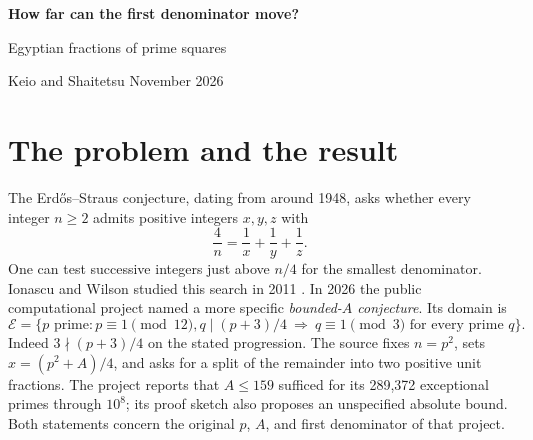 \documentclass[a4paper,11pt]{article}
\theoremstyle{definition}\newtheorem{question}[theorem]{Question}
\newcommand{\E}{\mathcal E}
\begin{document}
\begin{center}
{\LARGE\bfseries\color{ink}How far can the first denominator move?\par}
\vspace{4pt}
{\large Egyptian fractions of prime squares}\par\vspace{8pt}
Keio and Shaitetsu\quad\textperiodcentered{} November 2026
\end{center}

\begin{abstract}
A public bounded-shift conjecture asks for an absolute constant $C$ such that, for every prime $p$ in a specified exceptional class, $4/p^2$ has a three-term Egyptian fraction expansion containing $1/x$ with $4x-p^2\le C$. We disprove it. For each prime $\ell\ge7$ congruent to $3$ modulo $4$, a positive lower proportion of exceptional base primes have least shift exactly $\ell$, simultaneously for $4/p^{2h}$ at every $h\ge1$. On square inputs the first shifts having positive lower relative density are precisely those primes $\ell$ and the numbers $3r$ with $r$ prime and $r\equiv1\pmod4$. Among all primes $p\equiv1\pmod{12}$, the $j$th value in this ordered list has relative density $2^{-j}$. Of eighteen shifts reported missing through $10^8$, thirteen are impossible and five occur. We give a deterministic certificate against the proposed bound $159$, and a separate application to the first three choices of denominator for $5/p$. The classical existence conjectures of Erd\H os--Straus and Sierpi\'nski remain open.
\end{abstract}

\section{The problem and the result}
The Erd\H os--Straus conjecture, dating from around 1948, asks whether every integer $n\ge2$ admits positive integers $x,y,z$ with
\begin{equation}\label{eq:original}
 \frac4n=\frac1x+\frac1y+\frac1z.
\end{equation}
One can test successive integers just above $n/4$ for the smallest denominator. Ionascu and Wilson studied this search in 2011 \cite{iw}. In 2026 the public computational project \cite{tier} named a more specific \emph{bounded-$A$ conjecture}. Its domain is
\[
 \E=\big\{p\text{ prime}:p\equiv1\pmod{12},       q\mid(p+3)/4\ \Longrightarrow\ q\equiv1\pmod3
       \text{ for every prime }q\big\}.
\]
Indeed $3\nmid(p+3)/4$ on the stated progression. The source fixes $n=p^2$, sets $x=(p^2+A)/4$, and asks for a split of the remainder into two positive unit fractions. The project reports that $A\le159$ sufficed for its 289,372 exceptional primes through $10^8$; its proof sketch also proposes an unspecified absolute bound. Both statements concern the original $p$, $A$, and first denominator of that project.
\end{document}
